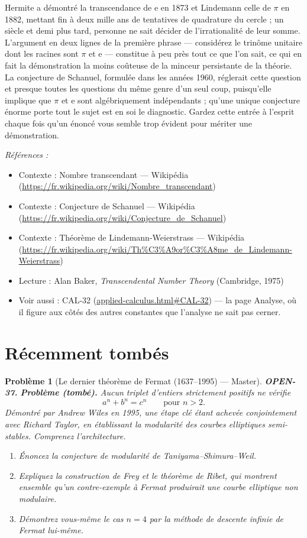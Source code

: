 \documentclass[11pt]{article}
\newtheorem{problem}{Problème}
\newenvironment{refs}{\par\small\noindent\emph{Références :}\begin{itemize}\setlength\itemsep{0pt}}{\end{itemize}\normalsize}
\begin{document}
\noindent Hermite a démontré la transcendance de e en 1873 et Lindemann celle de
$\pi$ en 1882, mettant fin à deux mille ans de tentatives de quadrature du cercle ; un siècle
et demi plus tard, personne ne sait décider de l'irrationalité de leur somme. L'argument en
deux lignes de la première phrase --- considérez le trinôme unitaire dont les racines sont $\pi$
et e --- constitue à peu près tout ce que l'on sait, ce qui en fait la démonstration la moins
coûteuse de la minceur persistante de la théorie. La conjecture de Schanuel, formulée dans
les années 1960, réglerait cette question et presque toutes les questions du même genre
d'un seul coup, puisqu'elle implique que $\pi$ et e sont algébriquement indépendants ; qu'une
unique conjecture énorme porte tout le sujet est en soi le diagnostic. Gardez cette entrée
à l'esprit chaque fois qu'un énoncé vous semble trop évident pour mériter une
démonstration.

\begin{refs}
\item Contexte : Nombre transcendant --- Wikipédia (\url{https://fr.wikipedia.org/wiki/Nombre_transcendant})
\item Contexte : Conjecture de Schanuel --- Wikipédia (\url{https://fr.wikipedia.org/wiki/Conjecture_de_Schanuel})
\item Contexte : Théorème de Lindemann-Weierstrass --- Wikipédia (\url{https://fr.wikipedia.org/wiki/Th%C3%A9or%C3%A8me_de_Lindemann-Weierstrass})
\item Lecture : Alan Baker, \textit{Transcendental Number Theory} (Cambridge, 1975)
\item Voir aussi : CAL-32 (\url{applied-calculus.html#CAL-32}) --- la page Analyse, où il figure aux côtés des autres constantes que l'analyse ne sait pas cerner.
\end{refs}

\bigskip


\section*{Récemment tombés}

\begin{problem}[{Le dernier théorème de Fermat (1637--1995) --- Master}]
\textbf{OPEN-37.} \textbf{Problème (tombé).} Aucun triplet d'entiers strictement positifs ne vérifie
\[ a^n + b^n = c^n \qquad \text{pour } n > 2. \]
Démontré par Andrew Wiles en 1995, une étape clé étant achevée conjointement avec Richard
Taylor, en établissant la modularité des courbes elliptiques semi-stables. Comprenez
l'architecture.
\begin{enumerate}
\item[(a)] Énoncez la conjecture de modularité de Taniyama--Shimura--Weil.
\item[(b)] Expliquez la construction de Frey et le théorème de Ribet, qui montrent ensemble qu'un
contre-exemple à Fermat produirait une courbe elliptique non modulaire.
\item[(c)] Démontrez vous-même le cas $ n = 4 $ par la méthode de descente infinie de Fermat
lui-même.
\end{enumerate}

\end{problem}
\end{document}
